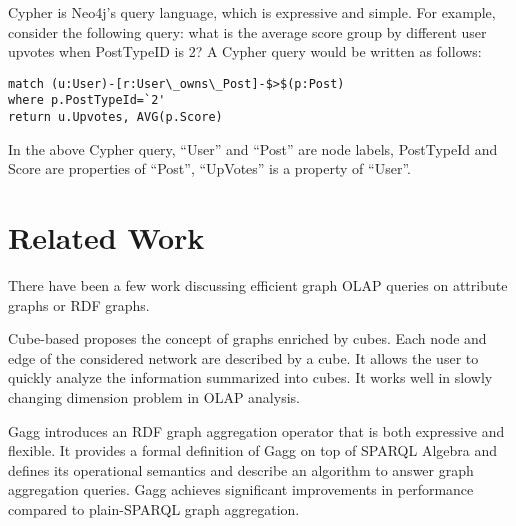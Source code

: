 Cypher is Neo4j’s query language, which is expressive and simple. For example, consider the following query: what is the average score group by different user upvotes when PostTypeID is 2? A Cypher query would be written as follows:

\begin{verbatim}
match (u:User)-[r:User\_owns\_Post]-$>$(p:Post) 
where p.PostTypeId=`2' 
return u.Upvotes, AVG(p.Score)
\end{verbatim}

In the above Cypher query, ``User'' and ``Post'' are node labels, PostTypeId and Score are properties of ``Post'', ``UpVotes'' is a property of ``User''.


%


\section{Related Work}

There have been a few work discussing efficient graph OLAP queries on attribute graphs or RDF graphs. 

Cube-based \cite{DBLP:conf/sofsem/JakawatFL16} proposes the concept of  graphs enriched by cubes. Each node and edge of the considered network are described by a cube. It allows the user to quickly analyze the information summarized into cubes. It works well in slowly changing dimension problem in OLAP analysis. 

Gagg \cite{DBLP:conf/esws/MaaliCD15} introduces an RDF graph aggregation operator that is both expressive and flexible. It provides a formal definition of Gagg on top of SPARQL Algebra and defines its operational semantics and describe an algorithm to answer graph aggregation queries. Gagg achieves significant improvements in performance compared to plain-SPARQL graph aggregation.

